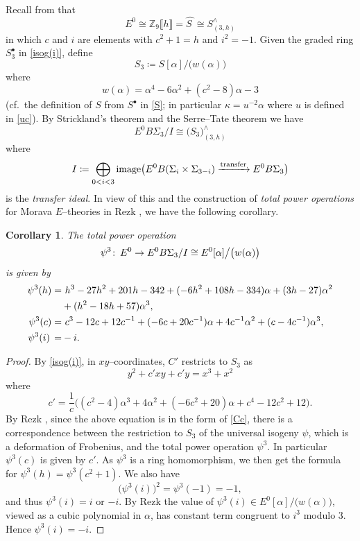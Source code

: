 \documentclass[microtype]{gtpart}     %
\newtheorem{cor}{Corollary}[section]
\theoremstyle{remark}
\theoremstyle{definition}
\def\co{\colon\thinspace}
\newcommand{\mb}[1]{\mathbb{#1}}
\newcommand{\BZ}{{\mb Z}}
\newcommand{\HS}{\widehat{S~}\!}
\newcommand{\ce}{\coloneqq}
\newcommand{\A}{\alpha}
\newcommand{\K}{\kappa}
\newcommand{\p}{\psi^3}
\newcommand{\s}{S^\bullet}
\newcommand{\isog}[1]{\fullref{prop:isog}\thinspace \eqref{isog(#1)}}
\begin{document}
Recall from  that 
\[
 E^0 \cong \BZ_9 \llbracket h \rrbracket = \HS \cong S_{(3,h)}^\wedge 
\]
in which $c$ and $i$ are elements with $c^2 + 1 = h$ and $i^2 = -1$.  Given 
the graded ring $\s_3$ in \isog{i}, define 
\begin{equation}
\label{S_3}
 S_3 \ce S [\A] \big/ \big( w(\A) \big) 
\end{equation}
where 
\[
 w(\A) = \A^4 - 6 \A^2 + (c^2 - 8) \A - 3 
\]
(cf.~the definition of $S$ from $\s$ in \eqref{S}; in particular 
$\K = u^{-2} \A$ where $u$ is defined in \eqref{uc}).  By Strickland's 
theorem \cite[Theorem 1.1]{Str98} and the Serre--Tate theorem 
\cite[Theorem 2.9.1]{KM} we have 
\[
 E^0 B\Sigma_3 / I \cong \big( S_3 \big)_{(3,h)}^\wedge 
\]
where 
\begin{equation}
\label{transfer}
 I \ce \bigoplus_{0<i<3} {\rm image} \big( E^0 B(\Sigma_i \times \Sigma_{3-i}) \xrightarrow{\rm transfer} E^0 B\Sigma_3 \big) 
\end{equation}
is the {\em transfer ideal}.  In view of this and the construction of 
{\em total power operations} for Morava $E$--theories in Rezk 
\cite[3.23]{cong}, we have the following corollary.  
\begin{cor}
\label{cor:psi3}
 The total power operation 
 \[
  \p \co E^0 \to E^0 B\Sigma_3 / I \cong E^0 [\A] \big/ \big( w(\A) \big) 
 \]
 is given by 
 \begin{equation*}
 \begin{split}
  \p(h) = & ~ h^3 - 27 h^2 + 201 h -342 + (-6 h^2 + 108 h - 334) \A + (3 h - 27) \A^2 \\
          & + (h^2 - 18 h + 57) \A^3, \\
  \p(c) = & ~ c^3 -12 c + 12 c^{-1} + (-6 c + 20 c^{-1}) \A + 4 c^{-1} \A^2 + (c - 4 c^{-1}) \A^3, \\
  \p(i) \thinspace = & -i.  
 \end{split}
 \end{equation*}
\end{cor}
\begin{proof}
 By \isog{i}, in $xy$--coordinates, $C'$ restricts to $S_3$ as 
 \[
  y^2 + c' x y + c' y = x^3 + x^2 
 \]
 where 
 \[
  c' = \frac{1}{c} \big( (c^2 - 4) \A^3 + 4 \A^2 + (-6 c^2 + 20) \A + c^4 - 12 c^2 + 12 \big).  
 \]
 By Rezk \cite[Theorem B]{cong}, since the above equation is in the form of 
 \eqref{Cc}, there is a correspondence between the restriction to $S_3$ of 
 the universal isogeny $\psi$, which is a deformation of Frobenius, and the 
 total power operation $\p$.  In particular $\p(c)$ is given by $c'$.  As 
 $\p$ is a ring homomorphism, we then get the formula for 
 $\p(h) = \p(c^2 + 1)$.  We also have 
 \[
  \big( \p(i) \big)^2 = \p(-1) = -1, 
 \]
 and thus $\p(i) = i$ or $-i$.  By Rezk 
 \cite[Propositions 3.25 and 10.5]{cong} the value of 
 $\p(i) \in E^0 [\A] \big/ \big( w(\A) \big)$, viewed as a cubic polynomial 
 in $\A$, has constant term congruent to $i^3$ modulo 3.  Hence $\p(i) = -i$.  
\end{proof}
\end{document}
